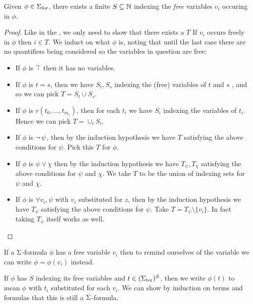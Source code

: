 \begin{prop}
    Given $\phi \in {\Sigma}_\mathrm{for}$,
    there exists a finite $S \subseteq \mathbb{N}$ 
    indexing the \emph{free} variables $v_i$ occuring in $\phi$.
\end{prop}
\begin{proof}
    Like in the , 
    we only need to show that there exists a $T$
    If $v_i$ occurs freely in $\phi$ then $i \in T$.
    We induct on what $\phi$ is, noting that until the last case there are
    no quantifiers being considered so the variables in question are free:
    \begin{itemize}
        \item If $\phi$ is $\top$ then it has no variables.
        \item If $\phi$ is $t = s$, 
        then we have $S_t, S_s$ indexing the (free) variables of $t$ and $s$ 
        ,
        and so we can pick $T = S_t \cup S_s$.
        \item If $\phi$ is $r(t_0, \dots, t_{m_r})$, 
        then for each $t_i$ we have $S_i$ indexing the variables of $t_i$.
        Hence we can pick $T = \cup_i S_i$.
        \item If $\phi$ is $\neg\, \psi$, 
        then by the induction hypothesis we have $T$ 
        satisfying the above conditions for $\psi$. 
        Pick this $T$ for $\phi$.
        \item If $\phi$ is $\psi \lor \chi$
        then by the induction hypothesis we have 
        $T_{\psi}, T_{\chi}$ satisfying the above conditions for $\psi$ and $\chi$.
        We take $T$ to be the union of indexing sets for $\psi$ and $\chi$.
        \item If $\phi$ is $\forall v_i, \psi$ with $v_i$ substituted for $z$,
        then by the induction hypothesis we have 
        $T_{\psi}$ satisfying the above conditions for $\psi$.
        Take $T = T_{\psi} \setminus \{v_i\}$. 
        In fact taking $T_{\psi}$ itself works as well.
    \end{itemize}
\end{proof}

\begin{nttn}
    If a $\Sigma$-formula $\phi$ has a free variable $v_i$ 
    then to remind ourselves of the variable we can write 
    $\phi = \phi(v_i)$ instead.

    If $\phi$ has $S$ indexing its free variables and $t \in ({\Sigma}_\mathrm{ter})^S$, 
    then we write $\phi(t)$ to mean $\phi$ with 
    $t_i$ substituted for each $v_i$.
    We can show by induction on terms and formulas that this is still a 
    $\Sigma$-formula.
\end{nttn}

